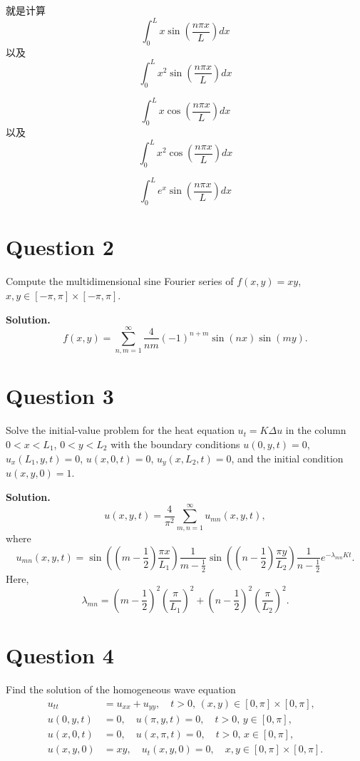 \documentclass[lang=en,11pt]{template}
\begin{document}
\begin{solution}
    就是计算 
    $$
    \int_0^L x \sin(\frac{n \pi x}{L}) dx
    $$
    以及 
    $$
     \int_0^L x^2 \sin(\frac{n \pi x}{L}) dx
    $$

    $$
    \int_0^L x \cos(\frac{n \pi x}{L}) dx
    $$
    以及 
    $$
     \int_0^L x^2 \cos(\frac{n \pi x}{L}) dx
    $$

    $$
    \int_0^L e^x \sin(\frac{n \pi x}{L}) dx
    $$
    
    
\end{solution}





\section*{Question 2}
Compute the multidimensional sine Fourier series of $f(x, y) = xy$, $x, y \in [-\pi, \pi] \times [-\pi, \pi]$.

\textbf{Solution.} 
\[
f(x,y) = \sum_{n,m=1}^{\infty} \frac{4}{nm} (-1)^{n+m} \sin(nx) \sin(my).
\]

\section*{Question 3}
Solve the initial-value problem for the heat equation $u_t = K \Delta u$ in the column $0 < x < L_1$, $0 < y < L_2$ with the boundary conditions $u(0,y,t) = 0$, $u_x(L_1,y,t) = 0$, $u(x,0,t) = 0$, $u_y(x,L_2,t) = 0$, and the initial condition $u(x,y,0) = 1$.

\textbf{Solution.} 
\[
u(x,y,t) = \frac{4}{\pi^2} \sum_{m,n=1}^{\infty} u_{mn}(x,y,t),
\]
where
\[
u_{mn}(x,y,t) = \sin\left( \left( m - \frac{1}{2} \right) \frac{\pi x}{L_1} \right) \frac{1}{m - \frac{1}{2}} \sin\left( \left( n - \frac{1}{2} \right) \frac{\pi y}{L_2} \right) \frac{1}{n - \frac{1}{2}} e^{-\lambda_{mn} K t}.
\]
Here,
\[
\lambda_{mn} = \left( m - \frac{1}{2} \right)^2 \left( \frac{\pi}{L_1} \right)^2 + \left( n - \frac{1}{2} \right)^2 \left( \frac{\pi}{L_2} \right)^2.
\]

\section*{Question 4}
Find the solution of the homogeneous wave equation
\[
\begin{aligned}
u_{tt} &= u_{xx} + u_{yy}, \quad t > 0, \, (x, y) \in [0, \pi] \times [0, \pi], \\
u(0, y, t) &= 0, \quad u(\pi, y, t) = 0, \quad t > 0, \, y \in [0, \pi], \\
u(x, 0, t) &= 0, \quad u(x, \pi, t) = 0, \quad t > 0, \, x \in [0, \pi], \\
u(x, y, 0) &= xy, \quad u_t(x, y, 0) = 0, \quad x, y \in [0, \pi] \times [0, \pi].
\end{aligned}
\]
\end{document}
